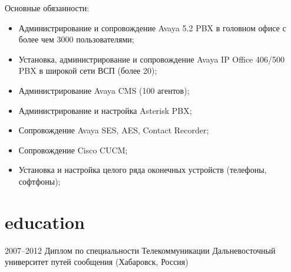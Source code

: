 \documentclass[]{cv-style}
\begin{document}
\begin{entrylist}
{  Основные обязанности:
  \begin{itemize}
      \item Администрирование и сопровождение Avaya 5.2 PBX в головном офисе с более чем 3000 пользователями;
      \item Установка, администрирование и сопровождение Avaya IP Office 406/500 PBX в широкой сети ВСП (более 20);
      \item Администрирование Avaya CMS (100 агентов);
      \item Администрирование и настройка Asterisk PBX;
      \item Сопровождение Avaya SES, AES, Contact Recorder;
      \item Сопровождение Cisco CUCM;
      \item Установка и настройка целого ряда оконечных устройств (телефоны, софтфоны);
  \end{itemize}}
\end{entrylist}

\section{education}

\begin{entrylist}
\entry
{2007--2012}
{Диплом по специальности Телекоммуникации}
{Дальневосточный университет путей сообщения (Хабаровск, Россия)}
{\vspace{-0.3cm}}
\end{entrylist}
\end{document}
